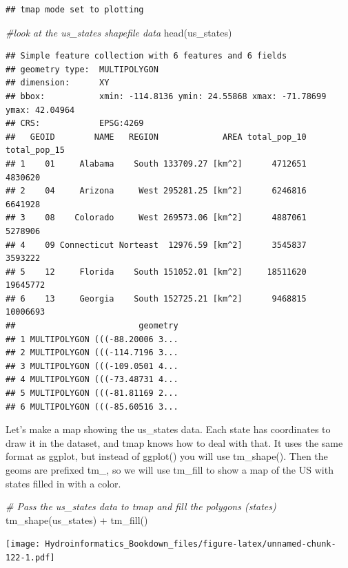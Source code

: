 \documentclass[
]{book}
\newenvironment{Shaded}{\begin{snugshade}}{\end{snugshade}}
\newcommand{\CommentTok}[1]{\textcolor[rgb]{0.56,0.35,0.01}{\textit{#1}}}
\newcommand{\FunctionTok}[1]{\textcolor[rgb]{0.00,0.00,0.00}{#1}}
\newcommand{\NormalTok}[1]{#1}
\newcommand{\SpecialCharTok}[1]{\textcolor[rgb]{0.00,0.00,0.00}{#1}}
\begin{document}
\begin{verbatim}
## tmap mode set to plotting
\end{verbatim}

\begin{Shaded}
\begin{Highlighting}[]
\CommentTok{\#look at the us\_states shapefile data}
\FunctionTok{head}\NormalTok{(us\_states)}
\end{Highlighting}
\end{Shaded}

\begin{verbatim}
## Simple feature collection with 6 features and 6 fields
## geometry type:  MULTIPOLYGON
## dimension:      XY
## bbox:           xmin: -114.8136 ymin: 24.55868 xmax: -71.78699 ymax: 42.04964
## CRS:            EPSG:4269
##   GEOID        NAME   REGION             AREA total_pop_10 total_pop_15
## 1    01     Alabama    South 133709.27 [km^2]      4712651      4830620
## 2    04     Arizona     West 295281.25 [km^2]      6246816      6641928
## 3    08    Colorado     West 269573.06 [km^2]      4887061      5278906
## 4    09 Connecticut Norteast  12976.59 [km^2]      3545837      3593222
## 5    12     Florida    South 151052.01 [km^2]     18511620     19645772
## 6    13     Georgia    South 152725.21 [km^2]      9468815     10006693
##                         geometry
## 1 MULTIPOLYGON (((-88.20006 3...
## 2 MULTIPOLYGON (((-114.7196 3...
## 3 MULTIPOLYGON (((-109.0501 4...
## 4 MULTIPOLYGON (((-73.48731 4...
## 5 MULTIPOLYGON (((-81.81169 2...
## 6 MULTIPOLYGON (((-85.60516 3...
\end{verbatim}

Let's make a map showing the us\_states data. Each state has coordinates to draw it in the dataset, and tmap knows how to deal with that. It uses the same format as ggplot, but instead of ggplot() you will use tm\_shape(). Then the geoms are prefixed tm\_, so we will use tm\_fill to show a map of the US with states filled in with a color.

\begin{Shaded}
\begin{Highlighting}[]
\CommentTok{\# Pass the us\_states data to tmap and fill the polygons (states)}
\FunctionTok{tm\_shape}\NormalTok{(us\_states) }\SpecialCharTok{+}
  \FunctionTok{tm\_fill}\NormalTok{() }
\end{Highlighting}
\end{Shaded}

\texttt{[image: Hydroinformatics\_Bookdown\_files/figure-latex/unnamed-chunk-122-1.pdf]}
\end{document}
